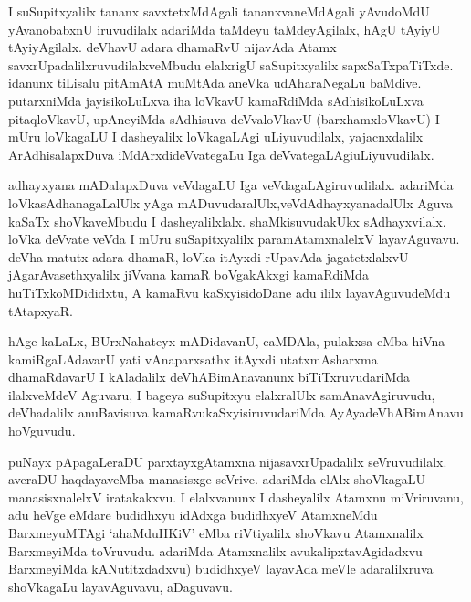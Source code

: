 
\begin{artha}
I suSupitxyalilx tananx savxtetxMdAgali tananxvaneMdAgali yAvudoMdU yAvanobabxnU iruvudilalx adariMda taMdeyu taMdeyAgilalx, hAgU tAyiyU tAyiyAgilalx. deVhavU adara dhamaRvU nijavAda Atamx savxrUpadalilxruvudilalxveMbudu elalxrigU saSupitxyalilx sapxSaTxpaTiTxde. idanunx tiLisalu pitAmAtA muMtAda aneVka udAharaNegaLu baMdive. putarxniMda jayisikoLuLxva iha loVkavU kamaRdiMda sAdhisikoLuLxva pitaqloVkavU, upAneyiMda sAdhisuva deVvaloVkavU (barxhamxloVkavU) I mUru loVkagaLU I dasheyalilx loVkagaLAgi uLiyuvudilalx, yajacnxdalilx ArAdhisalapxDuva iMdArxdideVvategaLu Iga deVvategaLAgi\break uLiyuvudilalx. 
\end{artha}

\begin{artha}%
adhayxyana mADalapxDuva veVdagaLU Iga veVdagaLAgiruvudilalx. adariMda loVkasAdhanagaLalUlx yAga mADuvudaralUlx,\break veVdAdhayxyanadalUlx Aguva kaSaTx shoVkaveMbudu I dasheyalilxlalx. shaMkisuvudakUkx sAdhayxvilalx. loVka deVvate veVda I mUru suSapitxyalilx paramAtamxnalelxV layavAguvavu. deVha matutx adara dhamaR, loVka itAyxdi rUpavAda jagatetxlalxvU jAgarAvasethxyalilx jiVvana kamaR boVgakAkxgi kamaRdiMda huTiTxkoMDididxtu, A kamaRvu kaSxyisidoDane adu ililx layavAguvudeMdu tAtapxyaR. 
\end{artha}


\begin{artha}
hAge kaLaLx, BUrxNahateyx mADidavanU, caMDAla, pulakxsa eMba hiVna kamiRgaLAdavarU yati vAnaparxsathx itAyxdi utatxmAsharxma dhamaRdavarU I kAladalilx deVhABimAnavanunx biTiTxruvudariMda ilalxveMdeV Aguvaru, I bageya suSupitxyu elalxralUlx samAnavAgiruvudu, deVhadalilx anuBavisuva kamaRvukaSxyisiruvudariMda AyAyadeVhABimAnavu hoVguvudu. 
\end{artha}


\begin{artha}
puNayx pApagaLeraDU parxtayxgAtamxna nijasavxrUpadalilx seVruvudilalx. averaDU haqdayaveMba manasisxge seVrive. adariMda elAlx shoVkagaLU manasisxnalelxV iratakakxvu. I elalxvanunx I dasheyalilx Atamxnu miVriruvanu, adu heVge eMdare budidhxyu idAdxga budidhxyeV AtamxneMdu BarxmeyuMTAgi `ahaMduHKiV' eMba riVtiyalilx shoVkavu Atamxnalilx BarxmeyiMda toVruvudu. adariMda Atamxnalilx avukalipxtavAgidadxvu BarxmeyiMda kANutitxdadxvu) budidhxyeV layavAda meVle adaralilxruva shoVkagaLu layavAguvavu, aDaguvavu. 
\end{artha}

